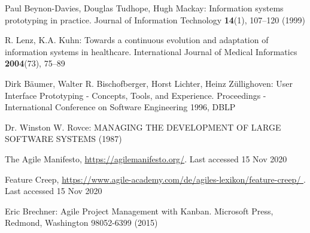 \documentclass[runningheads]{llncs}
\begin{document}
%
%
%
% 
% 
%
\begin{thebibliography}{8}

Paul Beynon-Davies, Douglas Tudhope, Hugh Mackay: Information systems prototyping in practice. 
Journal of Information Technology  \textbf{14}(1), 107--120 (1999) 

R. Lenz, K.A. Kuhn: Towards a continuous evolution and adaptation of
information systems in healthcare. 
International Journal of Medical Informatics   \textbf{2004}(73), 75--89

Dirk Bäumer, Walter R. Bischofberger, Horst Lichter, Heinz Züllighoven: User Interface Prototyping - Concepts, Tools, and Experience.
Proceedings - International Conference on Software Engineering 1996, DBLP 

Dr. Winston W. Rovce: MANAGING THE DEVELOPMENT OF LARGE SOFTWARE SYSTEMS (1987)

The Agile Manifesto, \url{https://agilemanifesto.org/}. Last accessed 15
Nov 2020

Feature Creep, \url{https://www.agile-academy.com/de/agiles-lexikon/feature-creep/
}. Last accessed 15
Nov 2020

Eric Brechner: Agile Project Management with Kanban. Microsoft Press,
Redmond, Washington 98052-6399 (2015)

\end{thebibliography} 
\end{document}
